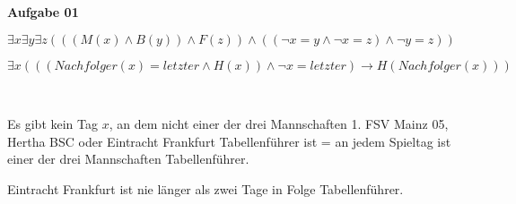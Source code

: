 \documentclass[a4paper,10pt]{article}
\begin{document}
	\parindent0pt
	\textbf{Aufgabe 01}
	\begin{compactenum} [(a)]
		\item \begin{compactenum} [(i)]
			\item $ \exists x \exists y \exists z (((M(x) \wedge B(y)) \wedge F(z))\wedge ((\lnot x=y \wedge \lnot x=z) \wedge \lnot y=z)) $
			\item $ \exists x (((Nachfolger(x) = letzter \wedge H(x))\wedge \lnot x = letzter)\rightarrow H(Nachfolger(x))) $
		\end{compactenum} \
		\item \begin{compactenum} [(i)]
			\item Es gibt kein Tag $x$,  an dem nicht einer der drei Mannschaften 1. FSV Mainz 05, Hertha BSC oder Eintracht Frankfurt Tabellenführer ist = an jedem Spieltag ist einer der drei Mannschaften Tabellenführer.
			\item Eintracht Frankfurt ist nie länger als zwei Tage in Folge Tabellenführer.
		\end{compactenum}
	\end{compactenum} \
	
\end{document}
